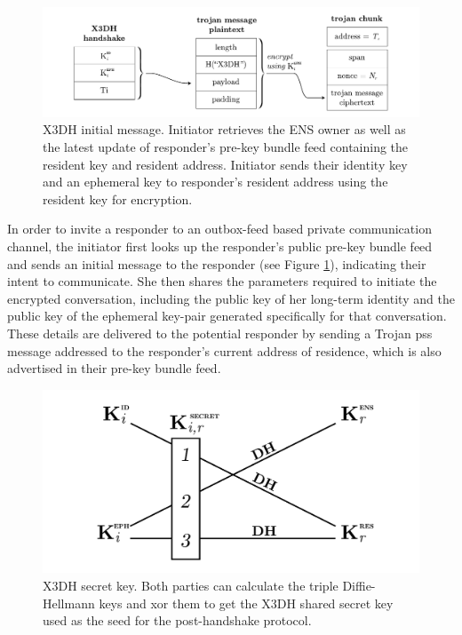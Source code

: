 \begin{figure}[htbp]
   \centering
   \includegraphics[width=.8\textwidth]{fig/x3dh-initial-message.pdf}
   \caption[X3DH initial message \statusgreen]{X3DH initial message. Initiator retrieves the ENS owner as well as the latest update of responder's pre-key bundle feed containing the resident key and resident address. Initiator sends their identity key and an ephemeral key to responder's resident address using the resident key for encryption. }
\label{fig:x3dh-initial-message}
\end{figure}


In order to invite a responder to an outbox-feed based private communication channel, the initiator first looks up the responder's public pre-key bundle feed and sends an initial message to the responder (see Figure \ref{fig:x3dh-initial-message}), indicating their intent to communicate. She then shares the parameters required to initiate the encrypted conversation, including the public key of her long-term identity and the public key of the ephemeral key-pair generated specifically for that conversation. These details are delivered to the potential responder by sending a Trojan pss message addressed to the responder's current address of residence, which is also advertised in their pre-key bundle feed. 

\begin{figure}[htbp]
   \centering
   \includegraphics[width=.6\textwidth]{fig/x3dh.pdf}
   \caption[X3DH secret key \statusgreen]{X3DH secret key. Both parties can calculate the triple Diffie-Hellmann keys and xor them to get the X3DH shared secret key used as the seed for the post-handshake protocol.}
   \label{fig:x3dh}
\end{figure}


